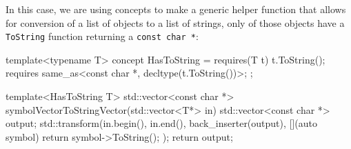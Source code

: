 In this case, we are using concepts to make a generic helper function that allows for conversion of a list of objects to a list of strings, only of those objects have a {\tt ToString} function returning a {\tt const char *}:
\begin{cpplong}
template<typename T> concept HasToString = requires(T t) {
    t.ToString();
    requires same_as<const char *, decltype(t.ToString())>;
};

template<HasToString T> std::vector<const char *> symbolVectorToStringVector(std::vector<T*> in) {
    std::vector<const char *> output;
    std::transform(in.begin(), in.end(), back_inserter(output), [](auto symbol) { return symbol->ToString(); });
    return output;
}
\end{cpplong}